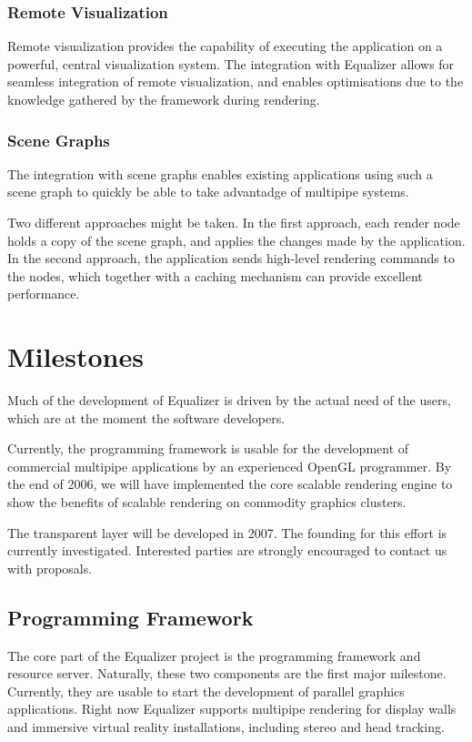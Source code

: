 \documentclass[10pt,a4paper]{scrartcl}
\begin{document}
\subsubsection{Remote Visualization}
Remote visualization provides the capability of executing the
application on a powerful, central visualization system. The integration
with Equalizer allows for seamless integration of remote visualization,
and enables optimisations due to the knowledge gathered by the
framework during rendering.

\subsubsection{Scene Graphs}
The integration with scene graphs enables existing applications
using such a scene graph to quickly be able to take advantadge of
multipipe systems.

Two different approaches might be taken. In the first approach, each render node
holds a copy of the scene graph, and applies the changes made by the
application. In the second approach, the application sends high-level
rendering commands to the nodes, which together with a caching mechanism
can provide excellent performance.

\section{Milestones}

Much of the development of Equalizer is driven by the actual need of the
users, which are at the moment the software developers. 

Currently, the programming framework is usable for the development of
commercial multipipe applications by an experienced OpenGL
programmer. By the end of 2006, we will have implemented the core
scalable rendering engine to show the benefits of scalable rendering on
commodity graphics clusters.

The transparent layer will be developed in 2007. The founding for this
effort is currently investigated. Interested parties are strongly
encouraged to contact us with proposals.

\subsection{Programming Framework}
The core part of the Equalizer project is the programming framework and
resource server. Naturally, these two components are the first major
milestone. Currently, they are usable to start the development of
parallel graphics applications. Right now Equalizer supports multipipe
rendering for display walls and immersive virtual reality installations,
including stereo and head tracking.
\end{document}
